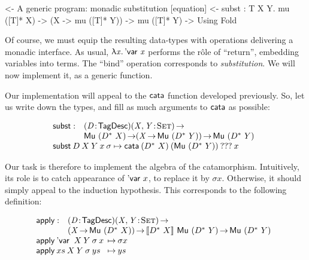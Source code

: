 \begin{wstructure}
<- A generic program: monadic substitution [equation]
    <- subst : \forall T X Y. mu ([T]* X) -> (X -> mu ([T]* Y)) -> mu ([T]* Y)
        -> Using Fold
\end{wstructure}

Of course, we must equip the resulting data-types with operations
delivering a monadic interface. As usual, \(\LAM{\x}\DVar{\x}\)
performs the r\^ole of ``return'', embedding variables into terms. The
``bind'' operation corresponds to \emph{substitution}. We will now
implement it, as a generic function.

Our implementation will appeal to the $\cata$ function developed
previously. So, let us write down the types, and fill as much
arguments to $\cata$ as possible:

\newcommand{\subst}{\F{subst}}
\newcommand{\apply}{\F{apply}}


\[\stk{
\begin{array}{@{}ll}
\subst : & \PITEL{\V{D}}{\TagDesc}
           \PI{\V{X}, \V{Y}}{\Set} \\
         & \Mu{(\FreeMonad{D}{X})} \To
           (\V{X} \To \Mu{(\FreeMonad{D}{Y})}) \To
           \Mu{(\FreeMonad{D}{Y})} 
\end{array} \\
\subst\: D\: X\: Y\: x\: \sigma \mapsto
  \cata\: (\FreeMonad{D}{X})\: (\Mu{(\FreeMonad{D}{Y})})\: ???\: x
}\]

Our task is therefore to implement the algebra of the
catamorphism. Intuitively, its role is to catch appearance of
$\DVar{x}$, to replace it by $\sigma x$. Otherwise, it should simply
appeal to the induction hypothesis. This corresponds to the following
definition:


\[\stk{
\begin{array}{@{}ll}
\apply : & \PITEL{\V{D}}{\TagDesc} 
           \PI{\V{X}, \V{Y}}{\Set} \\
         & (\V{X} \To \Mu{(\FreeMonad{D}{X})}) \To
           \descop{\FreeMonad{D}{X}}{\Mu{(\FreeMonad{D}{Y})}} \To
           \Mu{(\FreeMonad{D}{Y})}                            \\
\end{array} \\
\begin{array}{@{}l@{\:\:\mapsto\:}l}
\apply\: \DVar{}\: X\: Y\: \sigma\: x  & \sigma x     \\
\apply\: xs\:      X\: Y\: \sigma\: ys & ys
\end{array}
}\]

